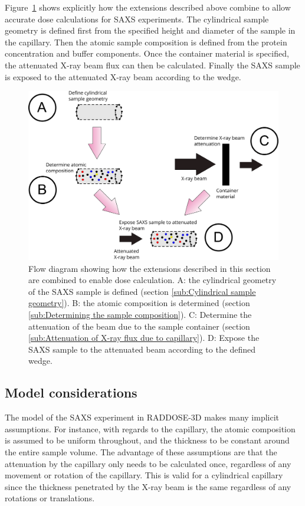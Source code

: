 Figure~\ref{fig:SAXS Flow diagram} shows explicitly how the extensions described above combine to allow accurate dose calculations for SAXS experiments.
The cylindrical sample geometry is defined first from the specified height and diameter of the sample in the capillary.
Then the atomic sample composition is defined from the protein concentration and buffer components.
Once the container material is specified, the attenuated X-ray beam flux can then be calculated.
Finally the SAXS sample is exposed to the attenuated X-ray beam according to the wedge.
\begin{figure}
    \centering
    \includegraphics[width=1\textwidth]{figures/saxs/SAXS_flowchart.pdf}
    \caption[Flow diagram summarising the SAXS extensions to RADDOSE-3D.]{Flow diagram showing how the extensions described in this section are combined to enable dose calculation.
    A: the cylindrical geometry of the SAXS sample is defined (section \ref{sub:Cylindrical sample geometry}).
    B: the atomic composition is determined (section \ref{sub:Determining the sample composition}).
    C: Determine the attenuation of the beam due to the sample container (section \ref{sub:Attenuation of X-ray flux due to capillary}).
    D: Expose the SAXS sample to the attenuated beam according to the defined wedge.}
    \label{fig:SAXS Flow diagram}
\end{figure}

\subsection{Model considerations}
\label{sub:Model considerations}
The model of the SAXS experiment in RADDOSE-3D makes many implicit assumptions.
For instance, with regards to the capillary, the atomic composition is assumed to be uniform throughout, and the thickness to be constant around the entire sample volume.
The advantage of these assumptions are that the attenuation by the capillary only needs to be calculated once, regardless of any movement or rotation of the capillary.
This is valid for a cylindrical capillary since the thickness penetrated by the X-ray beam is the same regardless of any rotations or translations.

